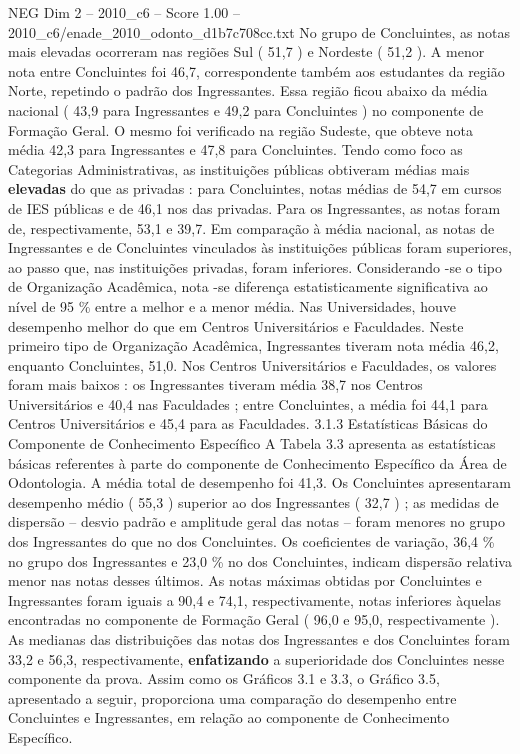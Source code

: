 \begin{textsample}{NEG Dim 2 – 2010\_c6 – Score 1.00 – 2010\_c6/enade\_2010\_odonto\_d1b7c708cc.txt}
No grupo de Concluintes, as notas mais elevadas ocorreram nas regiões Sul ( 51,7 ) e Nordeste ( 51,2 ).
A menor nota entre Concluintes foi 46,7, correspondente também aos estudantes da região Norte, repetindo o padrão dos Ingressantes.
Essa região ficou abaixo da média nacional ( 43,9 para Ingressantes e 49,2 para Concluintes ) no componente de Formação Geral.
O mesmo foi verificado na região Sudeste, que obteve nota média 42,3 para Ingressantes e 47,8 para Concluintes.
Tendo como foco as Categorias Administrativas, as instituições públicas obtiveram médias mais \textbf{elevadas} do que as privadas : para Concluintes, notas médias de 54,7 em cursos de IES públicas e de 46,1 nos das privadas.
Para os Ingressantes, as notas foram de, respectivamente, 53,1 e 39,7.
Em comparação à média nacional, as notas de Ingressantes e de Concluintes vinculados às instituições públicas foram superiores, ao passo que, nas instituições privadas, foram inferiores.
Considerando -se o tipo de Organização Acadêmica, nota -se diferença estatisticamente significativa ao nível de 95 \% entre a melhor e a menor média.
Nas Universidades, houve desempenho melhor do que em Centros Universitários e Faculdades.
Neste primeiro tipo de Organização Acadêmica, Ingressantes tiveram nota média 46,2, enquanto Concluintes, 51,0.
Nos Centros Universitários e Faculdades, os valores foram mais baixos : os Ingressantes tiveram média 38,7 nos Centros Universitários e 40,4 nas Faculdades ; entre Concluintes, a média foi 44,1 para Centros Universitários e 45,4 para as Faculdades. 3.1.3 Estatísticas Básicas do Componente de Conhecimento Específico A Tabela 3.3 apresenta as estatísticas básicas referentes à parte do componente de Conhecimento Específico da Área de Odontologia.
A média total de desempenho foi 41,3.
Os Concluintes apresentaram desempenho médio ( 55,3 ) superior ao dos Ingressantes ( 32,7 ) ; as medidas de dispersão – desvio padrão e amplitude geral das notas – foram menores no grupo dos Ingressantes do que no dos Concluintes.
Os coeficientes de variação, 36,4 \% no grupo dos Ingressantes e 23,0 \% no dos Concluintes, indicam dispersão relativa menor nas notas desses últimos.
As notas máximas obtidas por Concluintes e Ingressantes foram iguais a 90,4 e 74,1, respectivamente, notas inferiores àquelas encontradas no componente de Formação Geral ( 96,0 e 95,0, respectivamente ).
As medianas das distribuições das notas dos Ingressantes e dos Concluintes foram 33,2 e 56,3, respectivamente, \textbf{enfatizando} a superioridade dos Concluintes nesse componente da prova.
Assim como os Gráficos 3.1 e 3.3, o Gráfico 3.5, apresentado a seguir, proporciona uma comparação do desempenho entre Concluintes e Ingressantes, em relação ao componente de Conhecimento Específico.

\end{textsample}
